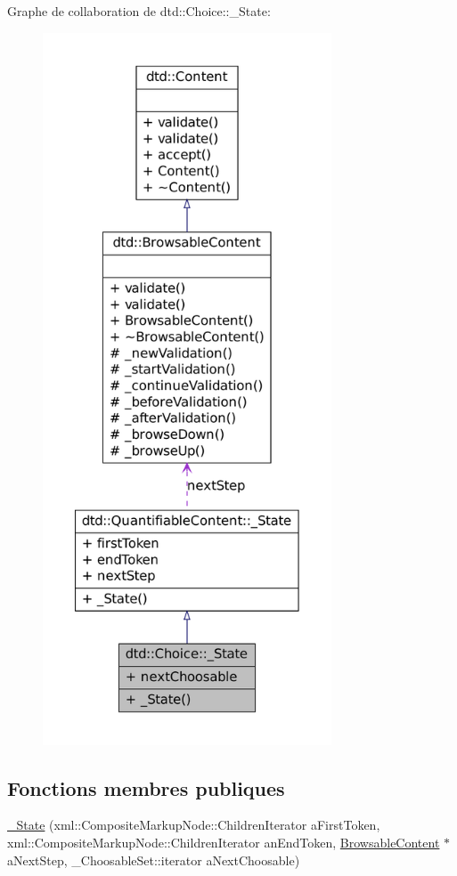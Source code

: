 Graphe de collaboration de dtd::Choice::\_\-State:\nopagebreak
\begin{figure}[H]
\begin{center}
\leavevmode
\includegraphics[height=600pt]{structdtd_1_1_choice_1_1___state__coll__graph}
\end{center}
\end{figure}
\subsection*{Fonctions membres publiques}
\begin{DoxyCompactItemize}
\item 
\hyperlink{structdtd_1_1_choice_1_1___state_a8c014d6674e17ef28429b38a535e20d6}{\_\-State} (xml::CompositeMarkupNode::ChildrenIterator aFirstToken, xml::CompositeMarkupNode::ChildrenIterator anEndToken, \hyperlink{classdtd_1_1_browsable_content}{BrowsableContent} $\ast$aNextStep, \_\-ChoosableSet::iterator aNextChoosable)
\end{DoxyCompactItemize}
